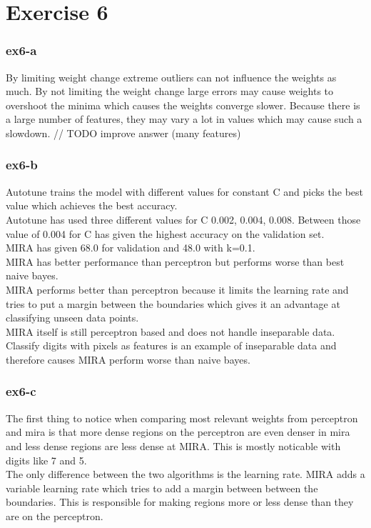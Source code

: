 \section{Exercise 6}
\subsubsection{ex6-a}
By limiting weight change extreme outliers can not influence the weights as much. By not limiting the weight change
large errors may cause weights to overshoot the minima which causes the weights converge slower. Because there is a large
number of features, they may vary a lot in values which may cause such a slowdown.
// TODO improve answer (many features)

\subsubsection{ex6-b}
Autotune trains the model with different values for constant C and picks the best value which achieves the best
accuracy.\\
Autotune has used three different values for C {0.002, 0.004, 0.008}. Between those value of 0.004 for C has given the
highest accuracy on the validation set. \\
MIRA has given 68.0%
for validation and 48.0%
with k=0.1.\\
MIRA has better performance than perceptron but performs worse than best naive bayes. \\
MIRA performs better than perceptron because it limits the learning rate and tries to put a margin between the
boundaries which gives it an advantage at classifying unseen data points. \\
MIRA itself is still perceptron based and does not handle inseparable data. Classify digits with pixels as features is
an example of inseparable data and therefore causes MIRA perform worse than naive bayes.

\subsubsection{ex6-c}
The first thing to notice when comparing most relevant weights from perceptron and mira is that more dense regions on
the perceptron are even denser in mira and less dense regions are less dense at MIRA. This is mostly noticable with
digits like 7 and 5.\\
The only difference between the two algorithms is the learning rate. MIRA adds a variable learning rate which tries to
add a margin between between the boundaries. This is responsible for making regions more or less dense than they are on
the perceptron.